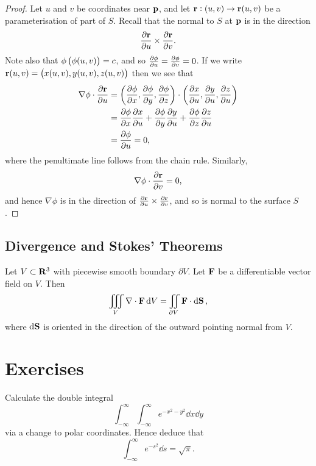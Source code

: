 \begin{proof}
Let $u$ and $v$ be coordinates near $\vb{p}$, and let $\vb{r}:(u,v)\to\vb{r}(u,v)$ be a parameterisation of part of $S$. Recall that the normal to $S$ at $\vb{p}$ is in the direction
\[\pdv{\vb{r}}{u}\times\pdv{\vb{r}}{v}.\]
Note also that $\phi\left(\phi(u,v)\right)=c$, and so $\pdv{\phi}{u}=\pdv{\phi}{v}=0$. If we write $\vb{r}(u,v)=\left(x(u,v),y(u,v),z(u,v)\right)$ then we see that
\begin{align*}
\nabla\phi\cdot\pdv{\vb{r}}{u}
&=\left(\pdv{\phi}{x},\pdv{\phi}{y},\pdv{\phi}{z}\right)\cdot\left(\pdv{x}{u},\pdv{y}{u},\pdv{z}{u}\right)\\
&=\pdv{\phi}{x}\pdv{x}{u}+\pdv{\phi}{y}\pdv{y}{u}+\pdv{\phi}{z}\pdv{z}{u}\\
&=\pdv{\phi}{u}=0,
\end{align*}
where the penultimate line follows from the chain rule. Similarly,
\[\nabla\phi\cdot\pdv{\vb{r}}{v}=0,\]
and hence $\nabla\phi$ is in the direction of $\pdv{\vb{r}}{u}\times\pdv{\vb{r}}{v}$, and so is normal to the surface $S$.
\end{proof}

\subsection{Divergence and Stokes' Theorems}
\begin{theorem}
Let $V\subset\mathbf R^3$ with piecewise smooth boundary $\partial V$. Let $\vb{F}$ be a differentiable vector field on $V$. Then
\begin{equation}
\iiint_V\nabla\cdot\vb{F}\dd{V}=\iint_{\partial V}\vb{F}\cdot\dd{\vb{S}},
\end{equation}
where $\dd{\vb{S}}$ is oriented in the direction of the outward pointing normal from $V$.
\end{theorem}
\pagebreak

\section*{Exercises}
\begin{prbm}
Calculate the double integral
\[\int_{-\infty}^{\infty}\int_{-\infty}^{\infty}e^{-x^2-y^2}\dd{x}\dd{y}\]
via a change to polar coordinates. Hence deduce that
\[\int_{-\infty}^{\infty}e^{-s^2}\dd{s}=\sqrt{\pi}.\]
\end{prbm}

